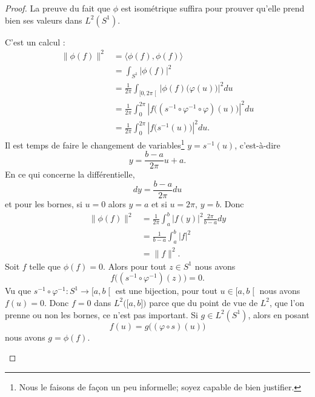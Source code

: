 \begin{proof}
	La preuve du fait que \( \phi\) est isométrique suffira pour prouver qu'elle prend bien ses valeurs dans \( L^2(S^1)\).
	\begin{subproof}
		\spitem[Isométrique]
		C'est un calcul :
		\begin{subequations}
			\begin{align}
				\| \phi(f) \|^2 & =\langle \phi(f), \phi(f)\rangle                                                             \\
				                & =\int_{S^1}| \phi(f) |^2                                                                     \\
				                & =\frac{1}{ 2\pi }\int_{\mathopen[ 0 , 2\pi \mathclose[}| \phi(f)\big( \varphi(u) \big) |^2du \\
				                & =\frac{1}{ 2\pi }\int_0^{2\pi}| f\big( (s^{-1}\circ\varphi^{-1}\circ\varphi)(u) \big) |^2du  \\
				                & =\frac{1}{ 2\pi }\int_0^{2\pi}| f\big( s^{-1}(u) \big) |^2du.
			\end{align}
		\end{subequations}
		Il est temps de faire le changement de variables\footnote{Nous le faisons de façon un peu informelle; soyez capable de bien justifier.} \( y=s^{-1}(u)\), c'est-à-dire
		\begin{equation}
			y=\frac{ b-a }{ 2\pi }u+a.
		\end{equation}
		En ce qui concerne la différentielle,
		\begin{equation}
			dy=\frac{ b-a }{ 2\pi }du
		\end{equation}
		et pour les bornes, si \( u=0\) alors \( y=a\) et si \( u=2\pi\), \( y=b\). Donc
		\begin{subequations}
			\begin{align}
				\| \phi(f) \|^2 & =\frac{1}{ 2\pi }\int_a^b| f(y) |^2\frac{ 2\pi }{ b-a }dy \\
				                & =\frac{1}{ b-a }\int_a^b| f |^2                           \\
				                & =\| f \|^2.
			\end{align}
		\end{subequations}
		\spitem[Injectif]
		Soit \( f\) telle que \( \phi(f)=0\). Alors pour tout \( z\in S^1\) nous avons
		\begin{equation}
			f\big( (s^{-1}\circ\varphi^{-1})(z) \big)=0.
		\end{equation}
		Vu que \( s^{-1}\circ\varphi^{-1}\colon S^1 \to \mathopen[ a , b \mathclose[\) est une bijection, pour tout \( u\in\mathopen[ a , b \mathclose[\) nous avons \( f(u)=0\). Donc \( f=0\) dans \( L^2\big( \mathopen[ a , b \mathclose] \big)\) parce que du point de vue de \( L^2\), que l'on prenne ou non les bornes, ce n'est pas important.
		\spitem[Surjectif]
		Si \( g\in L^2(S^1)\), alors en posant
		\begin{equation}
			f(u)=g\big( (\varphi\circ s)(u) \big)
		\end{equation}
		nous avons \( g=\phi(f)\).
	\end{subproof}
\end{proof}

